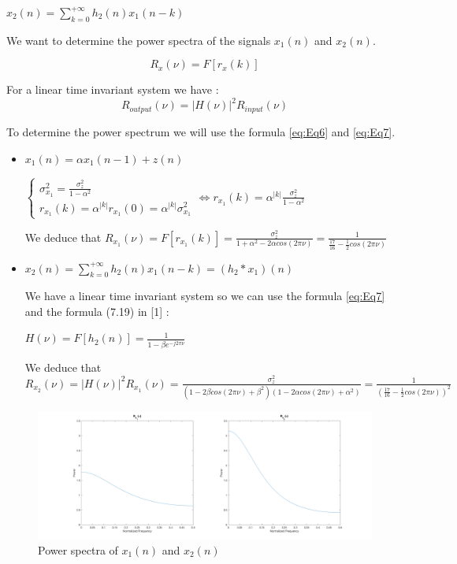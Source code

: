 \documentclass[onecolumn, 12pt]{IEEEtran}
\begin{document}
$x_2(n) = \sum_{k = 0}^{+\infty}{h_2(n)x_1(n-k)}$

We want to determine the power spectra of the signals $x_1(n)$ and $x_2(n)$.

\begin{equation} \label{eq:Eq6}
	R_{x}(\nu) = F[r_{x}(k)]
\end{equation}

For a linear time invariant system we have :
\begin{equation} \label{eq:Eq7}
	R_{output}(\nu) = |H(\nu)|^2R_{input}(\nu)
\end{equation}

To determine the power spectrum we will use the formula \eqref{eq:Eq6} and \eqref{eq:Eq7}.

\begin{itemize}
	\item $x_1(n) = \alpha x_1(n-1) + z(n)$

$\begin{cases} \sigma_{x_1}^2 = \frac{\sigma_z^2}{1 - \alpha^2} \\ r_{x_1}(k) = \alpha^{|k|}r_{x_1}(0) = \alpha^{|k|}\sigma_{x_1}^2 \end{cases} \Leftrightarrow  r_{x_1}(k) = \alpha^{|k|}\frac{\sigma_z^2}{1 - \alpha^2}$
\newline

We deduce that $R_{x_1}(\nu) = F[r_{x_1}(k)] = \frac{\sigma_z^2}{1 + \alpha^2 - 2\alpha cos(2\pi\nu)} = \frac{1}{\frac{17}{16} - \frac{1}{2}cos(2\pi\nu)}$

	\item $x_2(n) = \sum_{k = 0}^{+\infty}{h_2(n)x_1(n-k)} = (h_2 * x_1)(n)$
\newline

We have a linear time invariant system so we can use the formula \eqref{eq:Eq7} and the formula (7.19) in [1] :

$H(\nu) = F[h_2(n)] = \frac{1}{1 - \beta e^{-j2\pi\nu}}$
\newline

We deduce that $R_{x_2}(\nu) = |H(\nu)|^2R_{x_1}(\nu) = \frac{\sigma_z^2}{(1-2\beta cos(2\pi\nu) + \beta^2)(1 - 2\alpha cos(2\pi\nu) + \alpha^2)} = \frac{1}{(\frac{17}{16} - \frac{1}{2}cos(2\pi\nu))^2}$

\end{itemize}

\begin{figure}[H]
	\centering
	\includegraphics[scale = 0.1]{Task6.png}
	\caption{Power spectra of $x_1(n)$ and $x_2(n)$}
\label{fig:Fig6}
\end{figure}
\end{document}
